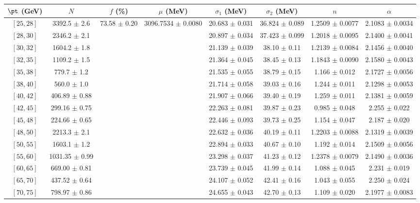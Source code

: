 \begin{tabular}{c||c|c|c|c|c|c|c}
$\pt$ (GeV) & $N$ & $f$ (\%) & $\mu$ (MeV) & $\sigma_1$ (MeV) & $\sigma_2$ (MeV) & $n$ & $\alpha$ \\
\hline
$[25, 28]$ & 3392.5 $\pm$ 2.6 & \multirow{19}{*}{73.58 $\pm$ 0.20} & \multirow{19}{*}{3096.7534 $\pm$ 0.0080} & 20.683 $\pm$ 0.031 & 36.824 $\pm$ 0.089 & 1.2509 $\pm$ 0.0077 & 2.1083 $\pm$ 0.0034\\
$[28, 30]$ & 2346.2 $\pm$ 2.1 &  &  & 20.897 $\pm$ 0.034 & 37.423 $\pm$ 0.099 & 1.2018 $\pm$ 0.0095 & 2.1400 $\pm$ 0.0041\\
$[30, 32]$ & 1604.2 $\pm$ 1.8 &  &  & 21.139 $\pm$ 0.039 & 38.10 $\pm$ 0.11 & 1.2139 $\pm$ 0.0084 & 2.1456 $\pm$ 0.0040\\
$[32, 35]$ & 1109.2 $\pm$ 1.5 &  &  & 21.364 $\pm$ 0.045 & 38.45 $\pm$ 0.13 & 1.1843 $\pm$ 0.0090 & 2.1580 $\pm$ 0.0043\\
$[35, 38]$ & 779.7 $\pm$ 1.2 &  &  & 21.535 $\pm$ 0.055 & 38.79 $\pm$ 0.15 & 1.166 $\pm$ 0.012 & 2.1727 $\pm$ 0.0056\\
$[38, 40]$ & 560.0 $\pm$ 1.0 &  &  & 21.714 $\pm$ 0.058 & 39.03 $\pm$ 0.16 & 1.244 $\pm$ 0.011 & 2.1298 $\pm$ 0.0053\\
$[40, 42]$ & 406.89 $\pm$ 0.88 &  &  & 21.907 $\pm$ 0.066 & 39.40 $\pm$ 0.19 & 1.259 $\pm$ 0.011 & 2.1381 $\pm$ 0.0059\\
$[42, 45]$ & 299.16 $\pm$ 0.75 &  &  & 22.263 $\pm$ 0.081 & 39.87 $\pm$ 0.23 & 0.985 $\pm$ 0.048 & 2.255 $\pm$ 0.022\\
$[45, 48]$ & 224.66 $\pm$ 0.65 &  &  & 22.446 $\pm$ 0.093 & 39.73 $\pm$ 0.25 & 1.154 $\pm$ 0.047 & 2.187 $\pm$ 0.020\\
$[48, 50]$ & 2213.3 $\pm$ 2.1 &  &  & 22.632 $\pm$ 0.036 & 40.19 $\pm$ 0.11 & 1.2203 $\pm$ 0.0088 & 2.1319 $\pm$ 0.0039\\
$[50, 55]$ & 1603.1 $\pm$ 1.2 &  &  & 22.894 $\pm$ 0.033 & 40.67 $\pm$ 0.10 & 1.192 $\pm$ 0.014 & 2.1509 $\pm$ 0.0056\\
$[55, 60]$ & 1031.35 $\pm$ 0.99 &  &  & 23.298 $\pm$ 0.037 & 41.23 $\pm$ 0.12 & 1.2378 $\pm$ 0.0079 & 2.1490 $\pm$ 0.0036\\
$[60, 65]$ & 669.00 $\pm$ 0.81 &  &  & 23.739 $\pm$ 0.045 & 41.99 $\pm$ 0.14 & 1.088 $\pm$ 0.045 & 2.231 $\pm$ 0.019\\
$[65, 70]$ & 437.52 $\pm$ 0.64 &  &  & 24.107 $\pm$ 0.052 & 42.41 $\pm$ 0.16 & 1.043 $\pm$ 0.055 & 2.250 $\pm$ 0.024\\
$[70, 75]$ & 798.97 $\pm$ 0.86 &  &  & 24.655 $\pm$ 0.043 & 42.70 $\pm$ 0.13 & 1.109 $\pm$ 0.020 & 2.1977 $\pm$ 0.0083\\

\end{tabular}
